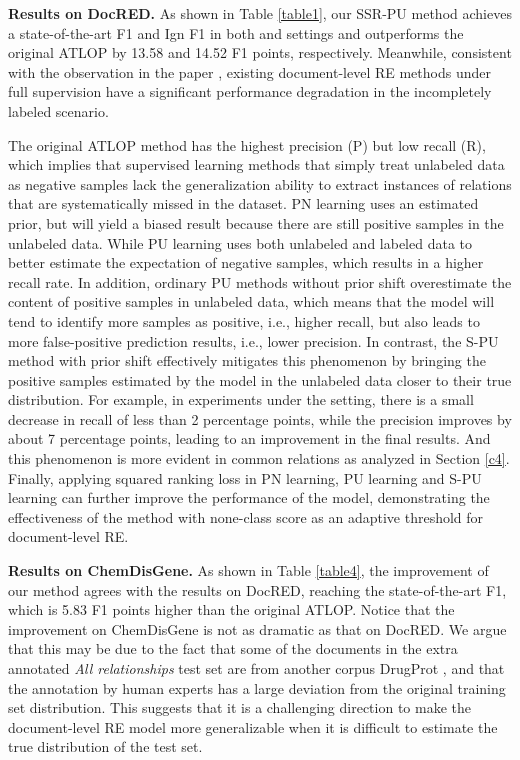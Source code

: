 \documentclass[11pt]{article}
\begin{document}
\textbf{Results on DocRED.} \enspace As shown in Table \ref{table1}, our SSR-PU method achieves a state-of-the-art F1 and Ign F1 in both  and  settings and outperforms the original ATLOP by 13.58 and 14.52 F1 points, respectively. Meanwhile, consistent with the observation in the paper \citep{huang-etal-2022-recommend}, existing document-level RE methods under full supervision have a significant performance degradation in the incompletely labeled scenario.

The original ATLOP method has the highest precision (P) but low recall (R), which implies that supervised learning methods that simply treat unlabeled data as negative samples lack the generalization ability to extract instances of relations that are systematically missed in the dataset. PN learning uses an estimated prior, but will yield a biased result because there are still positive samples in the unlabeled data. While PU learning uses both unlabeled and labeled data to better estimate the expectation of negative samples, which results in a higher recall rate. In addition, ordinary PU methods without prior shift overestimate the content of positive samples in unlabeled data, which means that the model will tend to identify more samples as positive, i.e., higher recall, but also leads to more false-positive prediction results, i.e., lower precision. In contrast, the S-PU method with prior shift effectively mitigates this phenomenon by bringing the positive samples estimated by the model in the unlabeled data closer to their true distribution. For example, in experiments under the  setting, there is a small decrease in recall of less than 2 percentage points, while the precision improves by about 7 percentage points, leading to an improvement in the final results. And this phenomenon is more evident in common relations as analyzed in Section \ref{c4}. Finally, applying squared ranking loss in PN learning, PU learning and S-PU learning can further improve the performance of the model, demonstrating the effectiveness of the method with none-class score as an adaptive threshold for document-level RE.

\textbf{Results on ChemDisGene.}
As shown in Table \ref{table4}, the improvement of our method agrees with the results on DocRED, reaching the state-of-the-art F1, which is 5.83 F1 points higher than the original ATLOP. Notice that the improvement on ChemDisGene is not as dramatic as that on DocRED. We argue that this may be due to the fact that some of the documents in the extra annotated \emph{All relationships} test set are from another corpus DrugProt \citep{miranda2021overview}, and that the annotation by human experts has a large deviation from the original training set distribution. This suggests that it is a challenging direction to make the document-level RE model more generalizable when it is difficult to estimate the true distribution of the test set.
\end{document}
